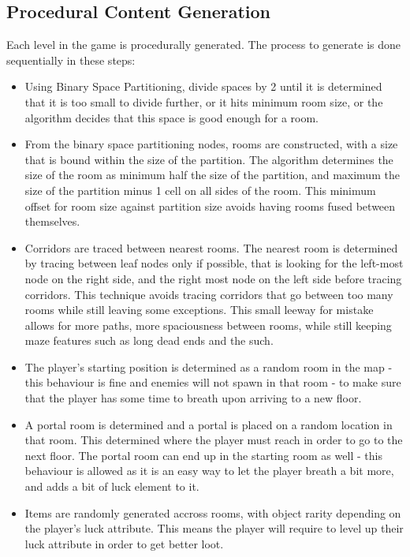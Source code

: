 \documentclass[11pt]{article}
\begin{document}
\subsection{Procedural Content Generation}
\label{sec:org5b02af1}
Each level in the game is procedurally generated. The process to generate is done sequentially in these steps:
\begin{itemize}
\item Using Binary Space Partitioning, divide spaces by 2 until it is determined that it is too small to divide further,
or it hits minimum room size, or the algorithm decides that this space is good enough for a room.
\item From the binary space partitioning nodes, rooms are constructed, with a size that is bound within the size of the partition.
The algorithm determines the size of the room as minimum half the size of the partition, and maximum the size of the
partition minus 1 cell on all sides of the room. This minimum offset for room size against partition size avoids having
rooms fused between themselves.
\item Corridors are traced between nearest rooms. The nearest room is determined by tracing between leaf nodes only if possible,
that is looking for the left-most node on the right side, and the right most node on the left side before tracing corridors. This technique avoids tracing corridors that go between too many rooms while still leaving some exceptions. This
small leeway for mistake allows for more paths, more spaciousness between rooms, while still keeping maze features such as
long dead ends and the such.
\item The player's starting position is determined as a random room in the map - this behaviour is fine and enemies
will not spawn in that room - to make sure that the player has some time to breath upon arriving to a new floor.
\item A portal room is determined and a portal is placed on a random location in that room. This determined where the player
must reach in order to go to the next floor. The portal room can end up in the starting room as well - this behaviour
is allowed as it is an easy way to let the player breath a bit more, and adds a bit of luck element to it.
\item Items are randomly generated accross rooms, with object rarity depending on the player's luck attribute. This means the
player will require to level up their luck attribute in order to get better loot.
\end{itemize}
\end{document}
